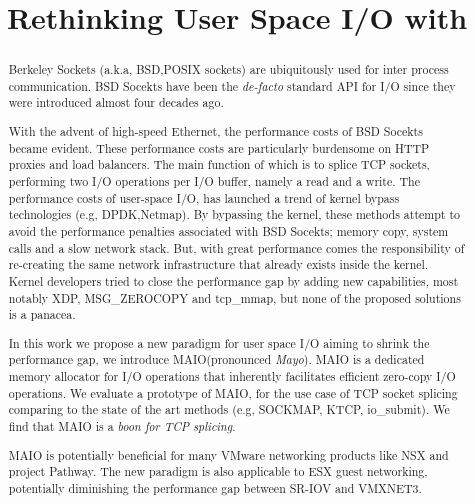 \documentclass[newfonts=false,format=sigconf,9pt,letterpaper]{acmart}
\title{Rethinking User Space I/O with \oursys}
\newcommand{\oursys}{MAIO\xspace}
\newcommand{\sockets}{BSD Socekts\xspace}
\begin{document}
\begin{abstract}
    Berkeley Sockets (a.k.a, BSD,POSIX sockets) are ubiquitously used for inter process communication. \sockets have been the \emph{de-facto} standard API for I/O since they were introduced almost four decades ago. 
    
    With the advent of high-speed Ethernet, the performance costs of \sockets became evident. These performance costs are particularly burdensome on HTTP proxies and load balancers. The main function of which is to splice TCP sockets, performing two I/O operations per I/O buffer, namely a read and a write. The performance costs of user-space I/O, has launched a trend of kernel bypass technologies (e.g, DPDK,Netmap). By bypassing the kernel, these methods attempt to avoid the performance penalties associated with \sockets; memory copy, system calls and a slow network stack. But, with great performance comes the responsibility of re-creating the same network infrastructure that already exists inside the kernel. Kernel developers tried to close the performance gap by adding new capabilities, most notably XDP, MSG\_ZEROCOPY and tcp\_mmap, but none of the proposed solutions is a panacea.
    
    In this work we propose a new paradigm for user space I/O aiming to shrink the performance gap, we introduce \oursys (pronounced \emph{Mayo}). \oursys is a dedicated memory allocator for I/O operations that inherently facilitates efficient zero-copy I/O operations. We evaluate a prototype of \oursys, for the use case of TCP socket splicing comparing to  the state of the art methods (e.g, SOCKMAP, KTCP, io\_submit). We find that \oursys is a \emph{boon for TCP splicing}. 
    
    \oursys is potentially beneficial for many VMware networking products like NSX and project Pathway. The new paradigm is also applicable to ESX guest networking, potentially diminishing the performance gap between SR-IOV and VMXNET3. 
    
    
\end{abstract}
\end{document}
